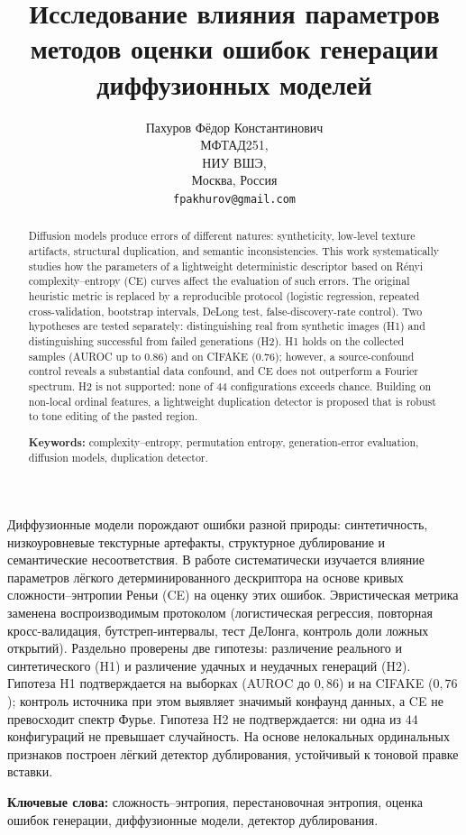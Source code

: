 \documentclass[14pt]{extarticle}
\title{Исследование влияния параметров методов оценки ошибок генерации диффузионных моделей}
\author{
    Пахуров Фёдор Константинович\\
    МФТАД251,\\
    НИУ ВШЭ,\\
    Москва, Россия\\
    \texttt{fpakhurov@gmail.com}
}
\date{}
\theoremstyle{plain}
\numberwithin{equation}{section}
\numberwithin{figure}{section}
\numberwithin{table}{section}
\begin{document}

\maketitle

\begin{abstractru}
Диффузионные модели порождают ошибки разной природы: синтетичность,
низкоуровневые текстурные артефакты, структурное дублирование и семантические
несоответствия. В работе систематически изучается влияние параметров лёгкого
детерминированного дескриптора на основе кривых сложности–энтропии Реньи (CE) на
оценку этих ошибок. Эвристическая метрика заменена воспроизводимым протоколом
(логистическая регрессия, повторная кросс-валидация, бутстреп-интервалы, тест
ДеЛонга, контроль доли ложных открытий). Раздельно проверены две гипотезы:
различение реального и синтетического (H1) и различение удачных и неудачных
генераций (H2). Гипотеза H1 подтверждается на выборках (AUROC до $0{,}86$) и на
CIFAKE ($0{,}76$); контроль источника при этом выявляет значимый конфаунд данных,
а CE не превосходит спектр Фурье. Гипотеза H2 не подтверждается: ни одна из $44$
конфигураций не превышает случайность. На основе нелокальных ординальных признаков
построен лёгкий детектор дублирования, устойчивый к тоновой правке вставки.

\medskip\noindent\textbf{Ключевые слова:} сложность–энтропия, перестановочная
энтропия, оценка ошибок генерации, диффузионные модели, детектор дублирования.
\end{abstractru}

\newpage
\begin{abstract}
Diffusion models produce errors of different natures: syntheticity, low-level
texture artifacts, structural duplication, and semantic inconsistencies. This
work systematically studies how the parameters of a lightweight deterministic
descriptor based on Rényi complexity–entropy (CE) curves affect the evaluation
of such errors. The original heuristic metric is replaced by a reproducible
protocol (logistic regression, repeated cross-validation, bootstrap intervals,
DeLong test, false-discovery-rate control). Two hypotheses are tested
separately: distinguishing real from synthetic images (H1) and distinguishing
successful from failed generations (H2). H1 holds on the collected samples
(AUROC up to $0.86$) and on CIFAKE ($0.76$); however, a source-confound control
reveals a substantial data confound, and CE does not outperform a Fourier
spectrum. H2 is not supported: none of $44$ configurations exceeds chance.
Building on non-local ordinal features, a lightweight duplication detector is
proposed that is robust to tone editing of the pasted region.

\medskip\noindent\textbf{Keywords:} complexity–entropy, permutation entropy,
generation-error evaluation, diffusion models, duplication detector.
\end{abstract}
\end{document}
